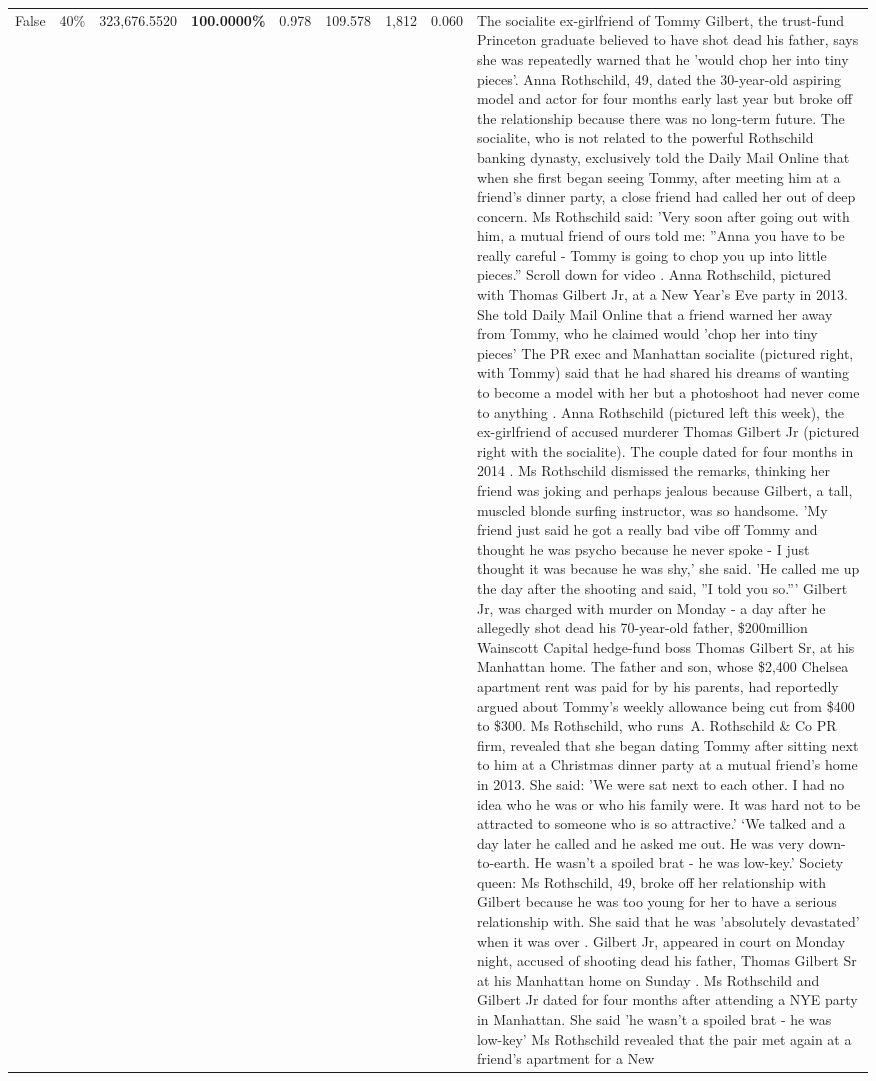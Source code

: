 \begin{table}[H]
\begin{tabular}{lllrlllll}
False & 40\% & 323,676.5520 & \bfseries \color{red} 100.0000\% & 0.978 & 109.578 & 1,812 & 0.060 & The socialite ex-girlfriend of Tommy Gilbert, the trust-fund Princeton graduate believed to have shot dead his father, says she was repeatedly warned that he 'would chop her into tiny pieces'. Anna Rothschild, 49, dated the 30-year-old aspiring model and actor for four months early last year but broke off the relationship because there was no long-term future. The socialite, who is not related to the powerful Rothschild banking dynasty, exclusively told the Daily Mail Online that when she first began seeing Tommy, after meeting him at a friend's dinner party, a close friend had called her out of deep concern. Ms Rothschild said: 'Very soon after going out with him, a mutual friend of ours told me: ''Anna you have to be really careful - Tommy is going to chop you up into little pieces.'' Scroll down for video . Anna Rothschild, pictured with Thomas Gilbert Jr, at a New Year's Eve party in 2013. She told Daily Mail Online that a friend warned her away from Tommy, who he claimed would 'chop her into tiny pieces' The PR exec and Manhattan socialite (pictured right, with Tommy) said that he had shared his dreams of wanting to become a model with her but a photoshoot had never come to anything . Anna Rothschild (pictured left this week), the ex-girlfriend of accused murderer Thomas Gilbert Jr (pictured right with the socialite). The couple dated for four months in 2014 . Ms Rothschild dismissed the remarks, thinking her friend was joking and perhaps jealous because Gilbert, a tall, muscled blonde surfing instructor, was so handsome. 'My friend just said he got a really bad vibe off Tommy and thought he was psycho because he never spoke - I just thought it was because he was shy,' she said. 'He called me up the day after the shooting and said, ''I told you so.''' Gilbert Jr, was charged with murder on Monday - a day after he allegedly shot dead his 70-year-old father, \$200million Wainscott Capital hedge-fund boss Thomas Gilbert Sr, at his Manhattan home. The father and son, whose \$2,400 Chelsea apartment rent was paid for by his parents, had reportedly argued about Tommy's weekly allowance being cut from \$400 to \$300. Ms Rothschild, who runs A. Rothschild \& Co PR firm, revealed that she began dating Tommy after sitting next to him at a Christmas dinner party at a mutual friend's home in 2013. She said: 'We were sat next to each other. I had no idea who he was or who his family were. It was hard not to be attracted to someone who is so attractive.' ‘We talked and a day later he called and he asked me out. He was very down-to-earth. He wasn’t a spoiled brat - he was low-key.’ Society queen: Ms Rothschild, 49, broke off her relationship with Gilbert because he was too young for her to have a serious relationship with. She said that he was 'absolutely devastated' when it was over . Gilbert Jr, appeared in court on Monday night, accused of shooting dead his father, Thomas Gilbert Sr at his Manhattan home on Sunday . Ms Rothschild and Gilbert Jr dated for four months after attending a NYE party in Manhattan. She said 'he wasn't a spoiled brat - he was low-key' Ms Rothschild revealed that the pair met again at a friend’s apartment for a New 
\end{tabular}
\end{table}
